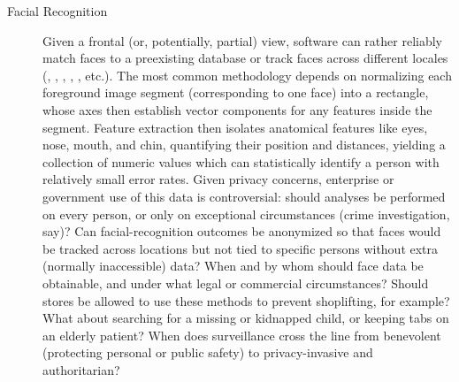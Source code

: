 {\begin{description}
\item[Facial Recognition]  Given a frontal (or, potentially, 
partial) view, software can 
rather reliably match faces to a preexisting database or 
track faces across different locales (\cite{WeiLunChao},
\cite{YueqiDuan}, \cite{GaryHuang}, 
\cite{KalaiselviNithya}, \cite{FengLu}, etc.).  
The most common methodology depends 
on normalizing each foreground image segment (corresponding to 
one face) into a rectangle, whose axes then establish vector 
components for any features inside the segment.  Feature extraction 
then isolates anatomical features like eyes, nose, mouth, and 
chin, quantifying their position and distances, yielding a 
collection of numeric values which can statistically 
identify a person with relatively small error rates.  
\pseudoIndent{}
Given privacy concerns, enterprise or government use 
of this data is controversial: should analyses be performed 
on every person, or only on exceptional circumstances 
(crime investigation, say)?  Can facial-recognition outcomes 
be anonymized so that faces would be tracked across locations 
but not tied to specific persons without extra (normally 
inaccessible) data?  When and by whom should face data be 
obtainable, and under what legal or commercial circumstances?  
Should stores be allowed to use these methods to 
prevent shoplifting, for example?  What about searching 
for a missing or kidnapped child, or keeping tabs on an 
elderly patient?  When does surveillance cross the line 
from benevolent (protecting personal or public safety) 
to privacy-invasive and authoritarian?
\end{description}
}
